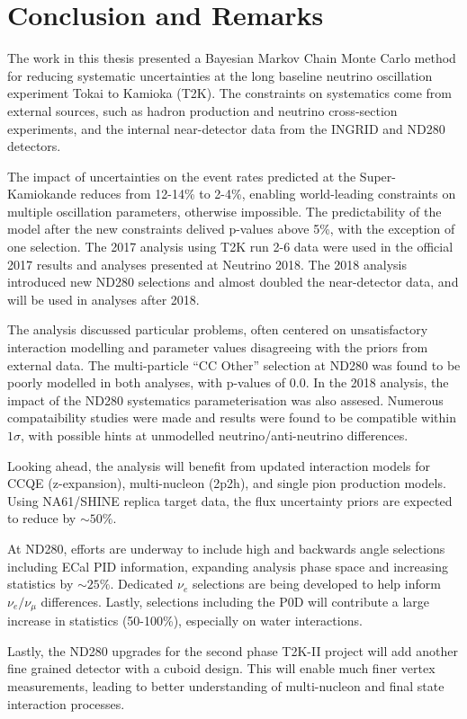 \chapter{Conclusion and Remarks}
\label{chap:conclusion}
The work in this thesis presented a Bayesian Markov Chain Monte Carlo method for reducing systematic uncertainties at the long baseline neutrino oscillation experiment Tokai to Kamioka (T2K). The constraints on systematics come from external sources, such as hadron production and neutrino cross-section experiments, and the internal near-detector data from the INGRID and ND280 detectors.

The impact of uncertainties on the event rates predicted at the Super-Kamiokande reduces from 12-14\% to 2-4\%, enabling world-leading constraints on multiple oscillation parameters, otherwise impossible. The predictability of the model after the new constraints delived p-values above 5\%, with the exception of one selection. The 2017 analysis using T2K run 2-6 data were used in the official 2017 results and analyses presented at Neutrino 2018. The 2018 analysis introduced new ND280 selections and almost doubled the near-detector data, and will be used in analyses after 2018.

The analysis discussed particular problems, often centered on unsatisfactory interaction modelling and parameter values disagreeing with the priors from external data. The multi-particle ``CC Other'' selection at ND280 was found to be poorly modelled in both analyses, with p-values of 0.0. In the 2018 analysis, the impact of the ND280 systematics parameterisation was also assesed. Numerous compataibility studies were made and results were found to be compatible within $1\sigma$, with possible hints at unmodelled neutrino/anti-neutrino differences.

Looking ahead, the analysis will benefit from updated interaction models for CCQE (z-expansion\cite{z-exp}), multi-nucleon (2p2h\cite{nieves1}), and single pion production models\cite{thesis_minoo}. Using NA61/SHINE replica target data, the flux uncertainty priors are expected to reduce by $\sim50\%$\cite{flux_red}.

At ND280, efforts are underway to include high and backwards angle selections including ECal PID information, expanding analysis phase space and increasing statistics by $\sim25\%$. Dedicated $\nu_e$ selections are being developed to help inform $\nu_e/\nu_\mu$ differences. Lastly, selections including the P0D will contribute a large increase in statistics (50-100\%), especially on water interactions.

Lastly, the ND280 upgrades\cite{t2k_upgrades} for the second phase T2K-II project\cite{t2k_ii} will add another fine grained detector with a cuboid design. This will enable much finer vertex measurements, leading to better understanding of multi-nucleon and final state interaction processes.